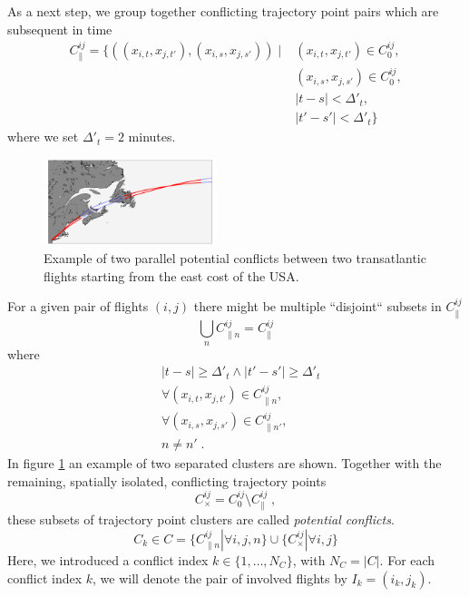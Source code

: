 \documentclass[aps,pra,twocolumn,10pt]{revtex4-1}
\begin{document}
As a next step, we group together conflicting trajectory point pairs which are subsequent in time
\begin{align*}
    C^{ij}_\parallel = \{ ((x_{i, t},  x_{j, t'}),  (x_{i, s},  x_{j, s'})) \; | \; & (x_{i, t},  x_{j, t'}) \in C^{ij}_0, \\
                                                                                    & (x_{i, s},  x_{j, s'}) \in C^{ij}_0, \\ 
                                                                                    & |t - s| < \Delta'_t,  \\
                                                                                    & |t' - s'| < \Delta'_t \}
\end{align*}
where we set $\Delta'_t = 2$ minutes.

\begin{figure}[t]
    \begin{center}
        \includegraphics[width=0.45\textwidth,natwidth=1,natheight=0]{./pics/example_conflict_in_real_space.pdf}
    \end{center}
    \caption{Example of two parallel potential conflicts between two transatlantic flights starting from the east cost of the USA.}
    \label{fig:example_parallel_conflict}
\end{figure}

For a given pair of flights $(i, j)$ there might be multiple ``disjoint`` subsets in $C^{ij}_\parallel$
\begin{equation*}
    \bigcup_{n} C^{ij}_{\parallel n} = C^{ij}_\parallel
\end{equation*}
where
\begin{align*}
    & |t - s| \geq \Delta'_t \land |t' - s'| \geq \Delta'_t \\
    & \forall (x_{i, t},  x_{j, t'}) \in C^{ij}_{\parallel n}, \\
    & \forall (x_{i, s},  x_{j, s'}) \in C^{ij}_{\parallel n'}, \\
    & n \neq n' \; .
\end{align*}
In figure \ref{fig:example_parallel_conflict} an example of two separated clusters are shown.
Together with the remaining, spatially isolated, conflicting trajectory points
\begin{equation*}
    C^{ij}_{\times} = C^{ij}_0 \setminus C^{ij}_\parallel \; ,
\end{equation*}
these subsets of trajectory point clusters are called \emph{potential conflicts}.
\begin{equation*}
    C_k \in C = \{ C^{ij}_{\parallel n} | \forall i, j, n\} \cup  \{C^{ij}_{\times} | \forall i, j\}
\end{equation*}
Here, we introduced a conflict index $k\in\{1, \dots, N_C\}$, with $N_C = |C|$.
For each conflict index $k$, we will denote the pair of involved flights by $I_k = (i_k, j_k)$.
\end{document}
